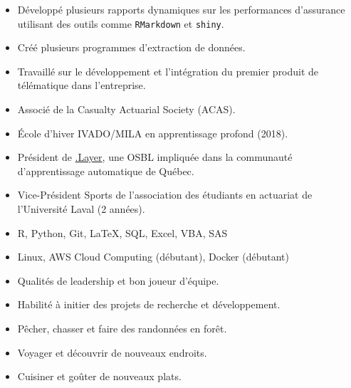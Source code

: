 \documentclass[10pt,a4paper,ragged2e]{altacv}
\begin{document}
\divider

\begin{itemize}
	\item Développé plusieurs rapports dynamiques sur les performances d'assurance utilisant des outils comme \texttt{RMarkdown} et \texttt{shiny}.
	\item Créé plusieurs programmes d'extraction de données.
	\item Travaillé sur le développement et l'intégration du premier produit de télématique dans l'entreprise.
\end{itemize}

\smallskip
\begin{itemize}
	\item Associé de la Casualty Actuarial Society (ACAS).
	\item École d'hiver IVADO/MILA en apprentissage profond (2018).
	\item Président de \href{https://www.dotlayer.org/about/}{.Layer}, une OSBL impliquée dans la communauté d'apprentissage automatique de Québec.
	\item Vice-Président Sports de l'association des étudiants en actuariat de l'Université Laval (2 années).
\end{itemize}

\smallskip
\begin{itemize}
	\item R, Python, Git, LaTeX, SQL, Excel, VBA, SAS
	\item Linux, AWS Cloud Computing (débutant), Docker (débutant)
\end{itemize}

\smallskip
\begin{itemize}
	\item Qualités de leadership et bon joueur d'équipe.
	\item Habilité à initier des projets de recherche et développement.
\end{itemize}

\smallskip
\begin{itemize}
\item Pêcher, chasser et faire des randonnées en forêt.
\item Voyager et découvrir de nouveaux endroits.
\item Cuisiner et goûter de nouveaux plats.
\end{itemize}
\end{document}
